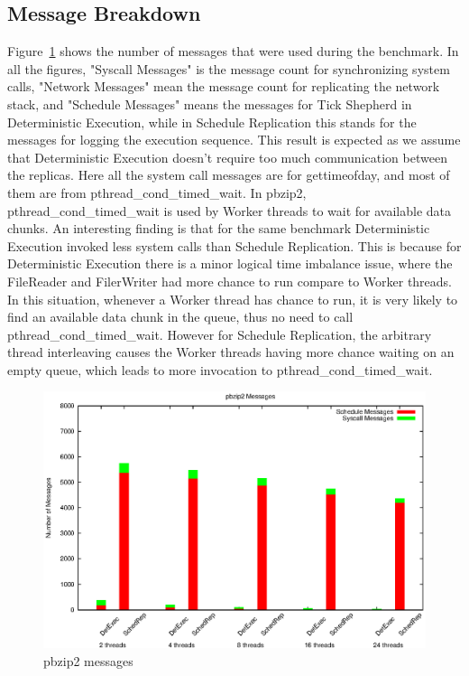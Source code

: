 \subsection{Message Breakdown}
Figure~\ref{f:pbzip2_msg} shows the number of messages that were used during the benchmark. In all the figures, "Syscall Messages" is the message count for synchronizing system calls, "Network Messages" mean the message count for replicating the network stack, and "Schedule Messages" means the messages for Tick Shepherd in Deterministic Execution, while in Schedule Replication this stands for the messages for logging the execution sequence. This result is expected as we assume that Deterministic Execution doesn't require too much communication between the replicas. Here all the system call messages are for gettimeofday, and most of them are from pthread\_cond\_timed\_wait. In pbzip2, pthread\_cond\_timed\_wait is used by Worker threads to wait for available data chunks. An interesting finding is that for the same benchmark Deterministic Execution invoked less system calls than Schedule Replication. This is because for Deterministic Execution there is a minor logical time imbalance issue, where the FileReader and FilerWriter had more chance to run compare to Worker threads. In this situation, whenever a Worker thread has chance to run, it is very likely to find an available data chunk in the queue, thus no need to call pthread\_cond\_timed\_wait. However for Schedule Replication, the arbitrary thread interleaving causes the Worker threads having more chance waiting on an empty queue, which leads to more invocation to pthread\_cond\_timed\_wait.
\begin{figure}
\centering
\includegraphics[width=1\columnwidth]{figures/pbzip2_msg}
\caption{pbzip2 messages}
\label{f:pbzip2_msg}
\end{figure}

